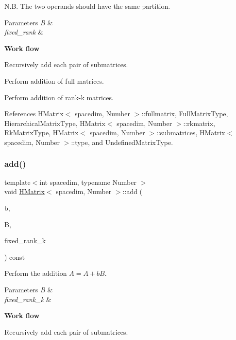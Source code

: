 N.\+B. The two operands should have the same partition.


\begin{DoxyParams}{Parameters}
{\em B} & \\
\hline
{\em fixed\+\_\+rank} & \\
\hline
\end{DoxyParams}
{\bfseries Work flow}

Recursively add each pair of submatrices.

Perform addition of full matrices.

Perform addition of rank-\/k matrices.

References H\+Matrix$<$ spacedim, Number $>$\+::fullmatrix, Full\+Matrix\+Type, Hierarchical\+Matrix\+Type, H\+Matrix$<$ spacedim, Number $>$\+::rkmatrix, Rk\+Matrix\+Type, H\+Matrix$<$ spacedim, Number $>$\+::submatrices, H\+Matrix$<$ spacedim, Number $>$\+::type, and Undefined\+Matrix\+Type.

\mbox{\label{classHMatrix_af42aaa86b9f47c5c1514e4f06e343db6}} 
\subsubsection{\texorpdfstring{add()}{add()}\hspace{0.1cm}{\footnotesize\ttfamily [4/10]}}
{\footnotesize\ttfamily template$<$int spacedim, typename Number $>$ \\
void \hyperlink{classHMatrix}{H\+Matrix}$<$ spacedim, Number $>$\+::add (\begin{DoxyParamCaption}\item[{const Number}]{b,  }\item[{const \hyperlink{classHMatrix}{H\+Matrix}$<$ spacedim, Number $>$ \&}]{B,  }\item[{const \hyperlink{classHMatrix_a5ca8dc549783d38371a01ecd621ecb34}{size\+\_\+type}}]{fixed\+\_\+rank\+\_\+k }\end{DoxyParamCaption}) const}

Perform the addition $A = A + b B$. 
\begin{DoxyParams}{Parameters}
{\em B} & \\
\hline
{\em fixed\+\_\+rank\+\_\+k} & \\
\hline
\end{DoxyParams}
{\bfseries Work flow}

Recursively add each pair of submatrices.


